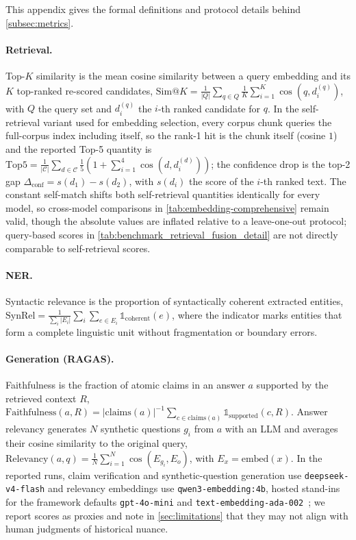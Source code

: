 \documentclass[11pt]{article}
\begin{document}
This appendix gives the formal definitions and protocol details behind \cref{subsec:metrics}.

\paragraph{Retrieval.} Top-\(K\) similarity is the mean cosine similarity between a query embedding and its \(K\) top-ranked re-scored candidates,
\(\text{Sim}@K = \frac{1}{|Q|}\sum_{q \in Q} \frac{1}{K}\sum_{i=1}^{K} \cos\!\left(q, d_i^{(q)}\right)\),
with \(Q\) the query set and \(d_i^{(q)}\) the \(i\)-th ranked candidate for \(q\). In the self-retrieval variant used for embedding selection, every corpus chunk queries the full-corpus index including itself, so the rank-1 hit is the chunk itself (cosine \(1\)) and the reported Top-5 quantity is
\(\text{Top5} = \frac{1}{|\mathcal{C}|}\sum_{d \in \mathcal{C}} \frac{1}{5}\left(1 + \sum_{i=1}^{4} \cos(d, d_i^{(d)})\right)\);
the confidence drop is the top-2 gap \(\Delta_{\text{conf}} = s(d_1) - s(d_2)\), with \(s(d_i)\) the score of the \(i\)-th ranked text. The constant self-match shifts both self-retrieval quantities identically for every model, so cross-model comparisons in \cref{tab:embedding-comprehensive} remain valid, though the absolute values are inflated relative to a leave-one-out protocol; query-based scores in \cref{tab:benchmark_retrieval_fusion_detail} are not directly comparable to self-retrieval scores.

\paragraph{NER.} Syntactic relevance is the proportion of syntactically coherent extracted entities,
\(\text{SynRel} = \frac{1}{\sum_i |E_i|}\sum_i \sum_{e \in E_i} \mathbb{1}_{\text{coherent}}(e)\),
where the indicator marks entities that form a complete linguistic unit without fragmentation or boundary errors.

\paragraph{Generation (RAGAS).} Faithfulness is the fraction of atomic claims in an answer \(a\) supported by the retrieved context \(R\),
\(\text{Faithfulness}(a, R) = |\text{claims}(a)|^{-1} \sum_{c \in \text{claims}(a)} \mathbb{1}_{\text{supported}}(c, R)\).
Answer relevancy generates \(N\) synthetic questions \(g_i\) from \(a\) with an LLM and averages their cosine similarity to the original query,
\(\text{Relevancy}(a,q) = \frac{1}{N}\sum_{i=1}^{N} \cos(E_{g_i}, E_o)\), with \(E_x = \text{embed}(x)\).
In the reported runs, claim verification and synthetic-question generation use \texttt{deepseek-v4-flash} and relevancy embeddings use \texttt{qwen3-embedding:4b}, hosted stand-ins for the framework defaults \texttt{gpt-4o-mini} and \texttt{text-embedding-ada-002}~\citep{es2024ragas}; we report scores as proxies and note in \cref{sec:limitations} that they may not align with human judgments of historical nuance.
\end{document}
